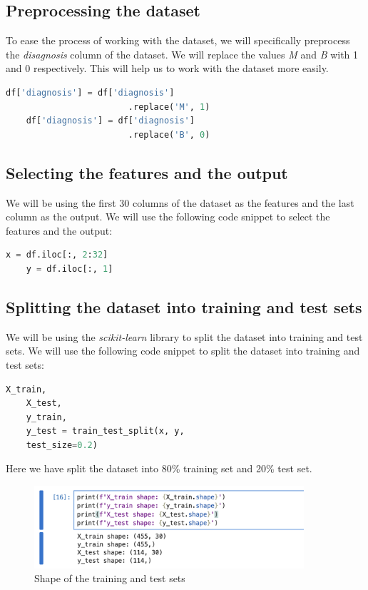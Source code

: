 \subsection{Preprocessing the dataset}
To ease the process of working with the dataset, we will specifically preprocess the \textit{disagnosis} column of the dataset. We will replace the values \textit{M} and \textit{B} with 1 and 0 respectively. This will help us to work with the dataset more easily.
\begin{lstlisting}[language=Python]
    df['diagnosis'] = df['diagnosis']
                        .replace('M', 1)
    df['diagnosis'] = df['diagnosis']
                        .replace('B', 0)
\end{lstlisting}
\subsection{Selecting the features and the output}
We will be using the first 30 columns of the dataset as the features and the last column as the output. We will use the following code snippet to select the features and the output:
\begin{lstlisting}[language=Python]
    x = df.iloc[:, 2:32]
    y = df.iloc[:, 1]
\end{lstlisting}
\subsection{Splitting the dataset into training and test sets}
We will be using the \textit{scikit-learn} library to split the dataset into training and test sets. We will use the following code snippet to split the dataset into training and test sets:
\begin{lstlisting}[language=Python]
    X_train, 
    X_test, 
    y_train, 
    y_test = train_test_split(x, y, 
    test_size=0.2)
\end{lstlisting}
Here we have split the dataset into 80\% training set and 20\% test set.
\begin{figure}[h]
    \centering
    \includegraphics[width=10cm]{ch/figures/split-shape.png}
    \caption{Shape of the training and test sets}
    \label{fig:split-shape}
\end{figure}
